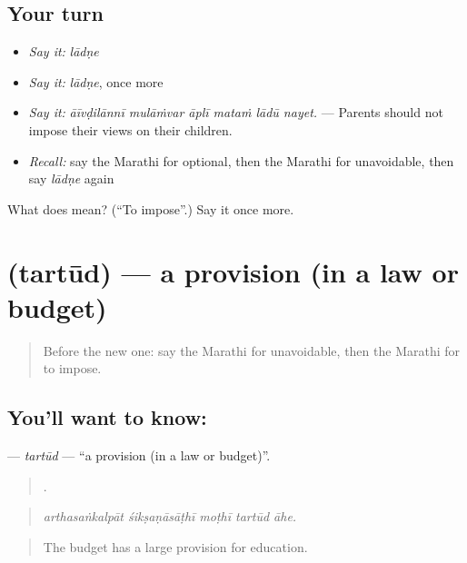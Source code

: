 \subsection*{Your turn}
\begin{itemize}
\raggedright
  \item \emph{Say it:} \emph{lādṇe}
  \item \emph{Say it:} \emph{lādṇe}, once more
  \item \emph{Say it:} \emph{āīvḍilānnī mulāṁvar āplī mataṁ lādū nayet.} — Parents should not impose their views on their children.
  \item \emph{Recall:} say the Marathi for optional, then the Marathi for unavoidable, then say \emph{lādṇe} again
\end{itemize}

\begin{tcolorbox}[breakable,colback=teal!4,colframe=teal!35!black,title={Before you move on}]
What does  mean? (\textquotedblleft{}To impose\textquotedblright{}.) Say it once more.
\end{tcolorbox}
\section[\texorpdfstring{\mr{तरतूद} (tartūd)}{तरतूद (tartūd)}]{ (tartūd) — a provision (in a law or budget)}

\label{lesson:MR-C380-tartud}



\begin{quote}
Before the new one: say the Marathi for unavoidable, then the Marathi for to impose.
\end{quote}

\subsection*{You'll want to know: }
\textbf{} — \emph{tartūd} — \textquotedblleft{}a provision (in a law or budget)\textquotedblright{}.

\begin{quote}
    .
\end{quote}

\begin{quote}
\emph{arthasaṅkalpāt śikṣaṇāsāṭhī moṭhī tartūd āhe.}
\end{quote}

\begin{quote}
The budget has a large provision for education.
\end{quote}

